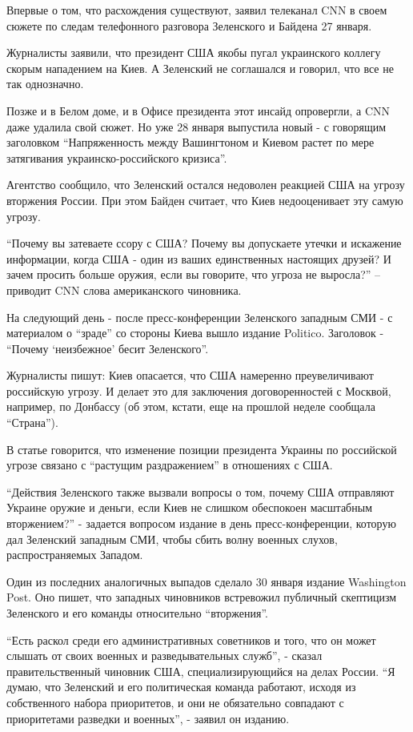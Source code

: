 Впервые о том, что расхождения существуют, заявил телеканал CNN в своем сюжете
по следам телефонного разговора Зеленского и Байдена 27 января.

Журналисты заявили, что президент США якобы пугал украинского коллегу скорым
нападением на Киев. А Зеленский не соглашался и говорил, что все не так
однозначно. 

Позже и в Белом доме, и в Офисе президента этот инсайд опровергли, а CNN даже
удалила свой сюжет. Но уже 28 января выпустила новый - с говорящим заголовком
\enquote{Напряженность между Вашингтоном и Киевом растет по мере затягивания
украинско-российского кризиса}. 

Агентство сообщило, что Зеленский остался недоволен реакцией США на угрозу
вторжения России. При этом Байден считает, что Киев недооценивает эту самую
угрозу.

\enquote{Почему вы затеваете ссору с США? Почему вы допускаете утечки и искажение
информации, когда США - один из ваших единственных настоящих друзей? И зачем
просить больше оружия, если вы говорите, что угроза не выросла?} – приводит CNN
слова американского чиновника.

На следующий день - после пресс-конференции Зеленского западным СМИ - с
материалом о \enquote{зраде} со стороны Киева вышло издание Politico. Заголовок -
\enquote{Почему \enquote{неизбежное} бесит Зеленского}.

Журналисты пишут: Киев опасается, что США намеренно преувеличивают российскую
угрозу. И делает это для заключения договоренностей с Москвой, например, по
Донбассу (об этом, кстати, еще на прошлой неделе сообщала \enquote{Страна}).

В статье говорится, что изменение позиции президента Украины по российской
угрозе связано с \enquote{растущим раздражением} в отношениях с США.

\enquote{Действия Зеленского также вызвали вопросы о том, почему США отправляют Украине
оружие и деньги, если Киев не слишком обеспокоен масштабным вторжением?} -
задается вопросом издание в день пресс-конференции, которую дал Зеленский
западным СМИ, чтобы сбить волну военных слухов, распространяемых Западом.

Один из последних аналогичных выпадов сделало 30 января издание Washington
Post. Оно пишет, что западных чиновников встревожил публичный скептицизм
Зеленского и его команды относительно \enquote{вторжения}.

\enquote{Есть раскол среди его административных советников и того, что он может слышать
от своих военных и разведывательных служб}, - сказал правительственный чиновник
США, специализирующийся на делах России. \enquote{Я думаю, что Зеленский и его
политическая команда работают, исходя из собственного набора приоритетов, и они
не обязательно совпадают с приоритетами разведки и военных}, - заявил он
изданию.

